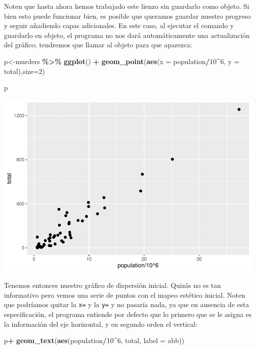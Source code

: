 \documentclass[
]{article}
\newenvironment{Shaded}{\begin{snugshade}}{\end{snugshade}}
\newcommand{\AttributeTok}[1]{\textcolor[rgb]{0.13,0.29,0.53}{#1}}
\newcommand{\DecValTok}[1]{\textcolor[rgb]{0.00,0.00,0.81}{#1}}
\newcommand{\FunctionTok}[1]{\textcolor[rgb]{0.13,0.29,0.53}{\textbf{#1}}}
\newcommand{\NormalTok}[1]{#1}
\newcommand{\OtherTok}[1]{\textcolor[rgb]{0.56,0.35,0.01}{#1}}
\newcommand{\SpecialCharTok}[1]{\textcolor[rgb]{0.81,0.36,0.00}{\textbf{#1}}}
\begin{document}
Noten que hasta ahora hemos trabajado este lienzo sin guardarlo como
objeto. Si bien esto puede funcionar bien, es posible que queramos
guardar nuestro progreso y seguir añadiendo capas adicionales. En este
caso, al ejecutar el comando y guardarlo en objeto, el programa no nos
dará automáticamente una actualización del gráfico; tendremos que llamar
al objeto para que aparezca:

\begin{Shaded}
\begin{Highlighting}[]
\NormalTok{p}\OtherTok{\textless{}{-}}\NormalTok{murders }\SpecialCharTok{\%\textgreater{}\%}
  \FunctionTok{ggplot}\NormalTok{() }\SpecialCharTok{+}
  \FunctionTok{geom\_point}\NormalTok{(}\FunctionTok{aes}\NormalTok{(}\AttributeTok{x =}\NormalTok{ population}\SpecialCharTok{/}\DecValTok{10}\SpecialCharTok{\^{}}\DecValTok{6}\NormalTok{, }\AttributeTok{y =}\NormalTok{ total),}\AttributeTok{size=}\DecValTok{2}\NormalTok{)}

\NormalTok{p}
\end{Highlighting}
\end{Shaded}

\includegraphics{Taller-2_files/figure-latex/unnamed-chunk-2-1.pdf}

Tenemos entonces nuestro gráfico de dispersión inicial. Quizás no es tan
informativo pero vemos una serie de puntos con el mapeo estético
inicial. Noten que podríamos quitar la \texttt{x=} y la \texttt{y=} y no
pasaría nada, ya que en ausencia de esta especificación, el programa
entiende por defecto que lo primero que se le asigna es la información
del eje horizontal, y en segundo orden el vertical:

\begin{Shaded}
\begin{Highlighting}[]
\NormalTok{p}\SpecialCharTok{+}
  \FunctionTok{geom\_text}\NormalTok{(}\FunctionTok{aes}\NormalTok{(population}\SpecialCharTok{/}\DecValTok{10}\SpecialCharTok{\^{}}\DecValTok{6}\NormalTok{, total, }\AttributeTok{label =}\NormalTok{ abb))}
\end{Highlighting}
\end{Shaded}
\end{document}

